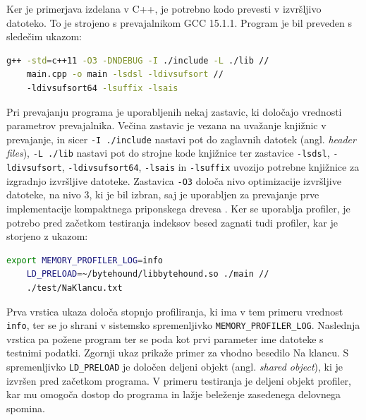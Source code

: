 Ker je primerjava izdelana v C++, je potrebno kodo prevesti v izvršljivo datoteko. To je strojeno s prevajalnikom GCC 15.1.1. Program je bil preveden s sledečim ukazom:
\begin{lstlisting}[language=bash]
    g++ -std=c++11 -O3 -DNDEBUG -I ./include -L ./lib // 
    main.cpp -o main -lsdsl -ldivsufsort //
    -ldivsufsort64 -lsuffix -lsais
\end{lstlisting}
\newpage
Pri prevajanju programa je uporabljenih nekaj zastavic, ki določajo vrednosti parametrov prevajalnika. Večina zastavic je vezana na uvažanje knjižnic v prevajanje, in sicer \verb|-I ./include| nastavi pot do zaglavnih datotek (angl. \textit{header files}), \verb|-L ./lib| nastavi pot do strojne kode knjižnice ter zastavice \verb|-lsdsl|, \verb|-ldivsufsort|, \verb|-ldivsufsort64|,  \verb|-lsais| in \verb|-lsuffix| uvozijo potrebne knjižnice za izgradnjo izvršljive datoteke.
Zastavica \verb|-O3| določa nivo optimizacije izvršljive datoteke, na nivo 3, ki je bil izbran, saj je uporabljen za prevajanje prve implementacije kompaktnega priponskega drevesa \cite{Valimaki2007}. Ker se uporablja profiler, je potrebo pred začetkom testiranja indeksov besed zagnati tudi profiler, kar je storjeno z ukazom:
\begin{lstlisting}[language=bash]
    export MEMORY_PROFILER_LOG=info
    LD_PRELOAD=~/bytehound/libbytehound.so ./main // 
    ./test/NaKlancu.txt 
\end{lstlisting}
Prva vrstica ukaza določa stopnjo profiliranja, ki ima v tem primeru vrednost \verb|info|, ter se jo shrani v sistemsko spremenljivko \verb|MEMORY_PROFILER_LOG|. Naslednja vrstica pa požene program ter se poda kot prvi parameter ime datoteke s testnimi podatki. Zgornji ukaz prikaže primer za vhodno besedilo Na klancu. S spremenljivko \verb|LD_PRELOAD| je določen deljeni objekt (angl. \textit{shared object}), ki je izvršen pred začetkom programa. V primeru testiranja je deljeni objekt profiler, kar mu omogoča dostop do programa in lažje beleženje zasedenega delovnega spomina.

